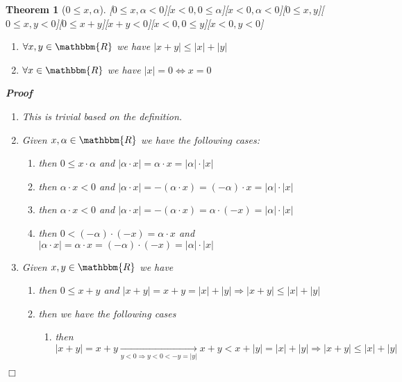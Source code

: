 \documentclass{book}
\newcommand{\Rightarrowlim}{\mathop{\rightarrow}\limits}
\newenvironment{proof}{\noindent\textbf{Proof\ }}{\hspace*{\fill}$\Box$\medskip}
\newtheorem{theorem}{Theorem}
\begin{document}
{{\begin{theorem}[$0 \leqslant x, \alpha$][$0 \leqslant x, \alpha < 0$][$x < 0,
0 \leqslant \alpha$][$x < 0, \alpha < 0$][$0 \leqslant x, y$][$0 \leqslant x,
y < 0$][$0 \leqslant x + y$][$x + y < 0$][$x < 0, 0 \leqslant y$][$x < 0, y <
0$]
\begin{enumerate}
    \item $\forall x, y \in \mathbbm{R}$ we have $| x + y | \leqslant | x | +
    | y |$
    
    \item $\forall x \in \mathbbm{R}$ we have $| x | = 0 \Leftrightarrow x =
    0$
  \end{enumerate}
  \begin{proof}
    
    \begin{enumerate}
      \item This is trivial based on the definition.
      
      \item Given $x, \alpha \in \mathbbm{R}$ we have the following cases:
      \begin{enumerate}
        \item then $0 \leqslant x \cdot \alpha$ and $| \alpha \cdot x | =
        \alpha \cdot x = | \alpha | \cdot | x |$
        
        \item then $\alpha \cdot x < 0$ and $| \alpha \cdot x | = - (\alpha
        \cdot x) = (- \alpha) \cdot x = | \alpha | \cdot | x |$
        
        \item then $\alpha \cdot x < 0$ and $| \alpha \cdot x | = - (\alpha
        \cdot x) = \alpha \cdot (- x) = | \alpha | \cdot | x |$
        
        \item then $0 < (- \alpha) \cdot (- x) = \alpha \cdot x$ and $| \alpha
        \cdot x | = \alpha \cdot x = (- \alpha) \cdot (- x) = | \alpha | \cdot
        | x |$
      \end{enumerate}
      \item Given $x, y \in \mathbbm{R}$ we have
      \begin{enumerate}
        \item then $0 \leqslant x + y$ and $| x + y | = x + y = | x | + | y |
        \Rightarrow | x + y | \leqslant | x | + | y |$
        
        \item then we have the following cases
        \begin{enumerate}
          \item then $| x + y | = x + y \Rightarrowlim_{y < 0 \Rightarrow y <
          0 < - y = | y |} x + y < x + | y | = | x | + | y | \Rightarrow | x +
          y | \leqslant | x | + | y |$
          

\end{enumerate}
\end{enumerate}
\end{enumerate}
\end{proof}
\end{theorem}}}
\end{document}
